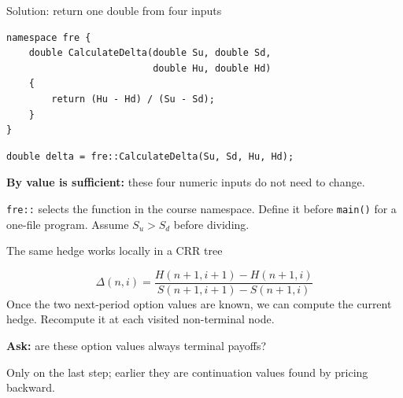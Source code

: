 \documentclass[10pt,aspectratio=169]{beamer}
\begin{document}
\begin{frame}[fragile]{Solution: return one double from four inputs}
\relax

\begin{lstlisting}
namespace fre {
    double CalculateDelta(double Su, double Sd,
                          double Hu, double Hd)
    {
        return (Hu - Hd) / (Su - Sd);
    }
}
\end{lstlisting}
\begin{lstlisting}
double delta = fre::CalculateDelta(Su, Sd, Hu, Hd);
\end{lstlisting}
\textbf{By value is sufficient:} these four numeric inputs do not need to change.\par
{\small \texttt{fre::} selects the function in the course namespace. Define it before \texttt{main()} for a one-file program. Assume $S_u>S_d$ before dividing.}

\end{frame}

\begin{frame}{The same hedge works locally in a CRR tree}
\relax

\begin{center}
\end{center}
\[
\boxed{\Delta(n,i)=\frac{H(n+1,i+1)-H(n+1,i)}
{S(n+1,i+1)-S(n+1,i)}}
\]
Once the two next-period option values are known, we can compute the current hedge. Recompute it at each visited non-terminal node.\par\smallskip
\textbf{Ask:} are these option values always terminal payoffs?\par
{\small Only on the last step; earlier they are continuation values found by pricing backward.}

\end{frame}
\end{document}
